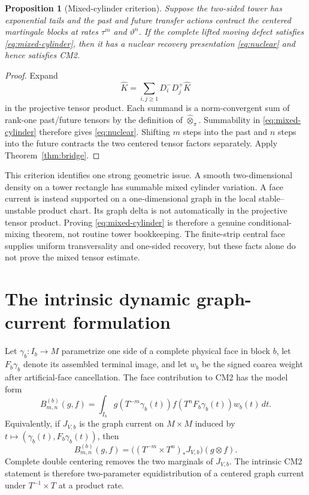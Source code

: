 \documentclass[11pt]{article}
\newtheorem{proposition}[theorem]{Proposition}
\begin{document}
\begin{proposition}[Mixed-cylinder criterion]
\label{prop:mixed-cylinder}
Suppose the two-sided tower has exponential tails and the past and future
transfer actions contract the centered martingale blocks at rates
$\tau^m$ and $\vartheta^n$.  If the complete lifted moving defect satisfies
\eqref{eq:mixed-cylinder}, then it has a nuclear recovery presentation
\eqref{eq:nuclear} and hence satisfies CM2.
\end{proposition}

\begin{proof}
Expand
\[
 \widehat K=\sum_{i,j\ge1}D_i^-D_j^+\widehat K
\]
in the projective tensor product.  Each summand is a norm-convergent sum of
rank-one past/future tensors by the definition of
$\widehat\otimes_\pi$.  Summability in \eqref{eq:mixed-cylinder} therefore
gives \eqref{eq:nuclear}.  Shifting $m$ steps into the past and $n$ steps into
the future contracts the two centered tensor factors separately.  Apply
Theorem~\ref{thm:bridge}.
\end{proof}

This criterion identifies one strong geometric issue.  A smooth two-dimensional
density on a tower rectangle has summable mixed cylinder variation.  A face
current is instead supported on a one-dimensional graph in the local
stable--unstable product chart.  Its graph delta is not automatically in the
projective tensor product.  Proving \eqref{eq:mixed-cylinder} is therefore a
genuine conditional-mixing theorem, not routine tower bookkeeping.  The
finite-strip central face supplies uniform transversality and one-sided
recovery, but these facts alone do not prove the mixed tensor estimate.

\section{The intrinsic dynamic graph-current formulation}

Let $\gamma_b:I_b\to M$ parametrize one side of a complete physical face in
block $b$, let $F_b\gamma_b$ denote its assembled terminal image, and let
$w_b$ be the signed coarea weight after artificial-face cancellation.  The
face contribution to CM2 has the model form
\begin{equation}
\label{eq:dynamic-graph}
 B_{m,n}^{(b)}(g,f)
 =\int_{I_b} g(T^{-m}\gamma_b(t))
                  f(T^nF_b\gamma_b(t))w_b(t)\,dt .
\end{equation}
Equivalently, if $J_{V,b}$ is the graph current on $M\times M$ induced by
$t\mapsto(\gamma_b(t),F_b\gamma_b(t))$, then
\begin{equation}
\label{eq:product-current}
 B_{m,n}^{(b)}(g,f)
 =\bigl((T^{-m}\times T^n)_*J_{V,b}\bigr)(g\otimes f).
\end{equation}
Complete double centering removes the two marginals of $J_{V,b}$.  The
intrinsic CM2 statement is therefore two-parameter equidistribution of a
centered graph current under $T^{-1}\times T$ at a product rate.
\end{document}
